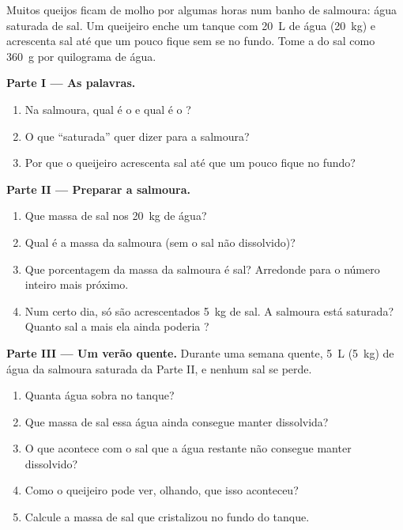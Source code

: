 \begin{problem}
\label{pb:g6:solutions-and-solubility:1}
Muitos queijos ficam de molho por algumas horas num banho de salmoura:
água saturada de sal. Um queijeiro enche um tanque com \qty{20}{L} de
água (\qty{20}{kg}) e acrescenta sal até que um pouco fique sem se
 no fundo. Tome a  do sal como \qty{360}{g} por
quilograma de água.

\medskip
\noindent\textbf{Parte I --- As palavras.}
\begin{enumerate}
  \item Na salmoura, qual é o  e qual é o ?
  \item O que ``saturada'' quer dizer para a salmoura?
  \item Por que o queijeiro acrescenta sal até que um pouco fique no
        fundo?
\end{enumerate}

\medskip
\noindent\textbf{Parte II --- Preparar a salmoura.}
\begin{enumerate}[resume]
  \item Que massa de sal  nos \qty{20}{kg} de água?
  \item Qual é a massa da salmoura (sem o sal não dissolvido)?
  \item Que porcentagem da massa da salmoura é sal? Arredonde para o
        número inteiro mais próximo.
  \item Num certo dia, só são acrescentados \qty{5}{kg} de sal. A
        salmoura está saturada? Quanto sal a mais ela ainda poderia
        ?
\end{enumerate}

\medskip
\noindent\textbf{Parte III --- Um verão quente.}
Durante uma semana quente, \qty{5}{L} (\qty{5}{kg}) de água  da
salmoura saturada da Parte II, e nenhum sal se perde.
\begin{enumerate}[resume]
  \item Quanta água sobra no tanque?
  \item Que massa de sal essa água ainda consegue manter dissolvida?
  \item O que acontece com o sal que a água restante não consegue manter
        dissolvido?
  \item Como o queijeiro pode ver, olhando, que isso aconteceu?
  \item Calcule a massa de sal que cristalizou no fundo do tanque.
\end{enumerate}
\end{problem}
